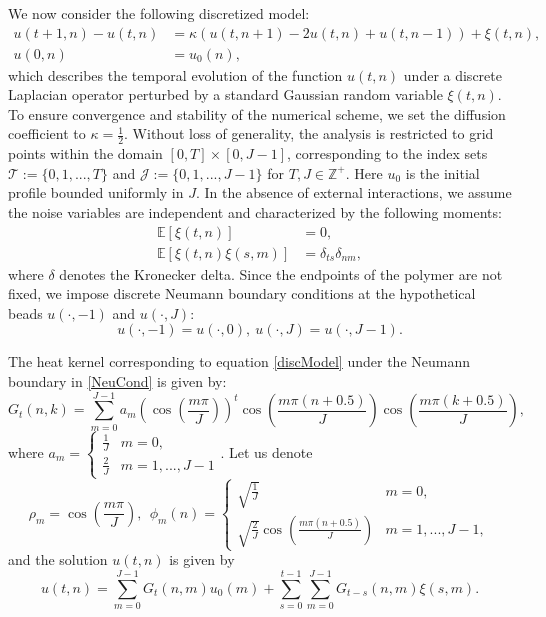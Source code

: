 \documentclass[12pt]{amsart}
\numberwithin{equation}{section}
\newcommand{\Z}{\mathbb{Z}}
\newcommand{\E}{\mathbb{E}}
\newcommand{\1}{\mathbf{1}}
\begin{document}
We now consider the following discretized model:
\begin{equation}
\label{discModel}
\begin{split}
 u(t+1,n)-u(t,n) &= \kappa\left(u(t,n+1)-2u(t,n)+u(t,n-1)\right)+\xi(t,n),\\
 u(0,n) &= u_0(n),
\end{split}
\end{equation}
which describes the temporal evolution of the function $u(t,n)$ under a discrete Laplacian operator perturbed by a standard Gaussian random variable $\xi(t,n)$. To ensure convergence and stability of the numerical scheme, we set the diffusion coefficient to $\kappa = \frac{1}{2}$. Without loss of generality, the analysis is restricted to grid points within the domain $[0,T]\times[0,J-1]$, corresponding to the index sets $\mathcal{T}:=\{0,1,...,T\}$ and $\mathcal{J}:=\{0,1,...,J-1\}$ for $T,J\in\Z^+$. Here $u_0$ is the initial profile bounded uniformly in $J$. In the absence of external interactions, we assume the noise variables are independent and characterized by the following moments:
\begin{equation}
\label{noise}
\begin{split}
\E[\xi(t,n)] &= 0,\\
\E[\xi(t,n)\xi(s,m)]&=\delta_{ts}\delta_{nm},
\end{split}
\end{equation}
where $\delta$ denotes the Kronecker delta. Since the endpoints of the polymer are not fixed, we impose discrete Neumann boundary conditions at the hypothetical beads $u(\cdot,-1)$ and $u(\cdot,J)$:
\begin{equation}
\label{NeuCond}
u(\cdot,-1) = u(\cdot,0),~u(\cdot,J) = u(\cdot, J-1).
\end{equation}

The heat kernel corresponding to equation \eqref{discModel} under the Neumann boundary in \eqref{NeuCond} is given by:
\begin{equation*}
    G_t(n,k)=\sum_{m=0}^{J-1}a_m\left(\cos\left(\frac{m\pi}{J}\right)\right)^{t}\cos\left(\frac{m\pi(n+0.5)}{J}\right)\cos\left(\frac{m\pi(k+0.5)}{J}\right),
\end{equation*}
where $a_m = \begin{cases}
\frac{1}{J}& m=0,\\
\frac{2}{J}&m=1,...,J-1
\end{cases}$.
Let us denote 
\begin{equation}
\label{kernel_notation}
\rho_m =\cos\left(\frac{m\pi}{J}\right),~~\phi_m(n)=\begin{cases}
\sqrt{\frac{1}{J}}& m=0,\\
\sqrt{\frac{2}{J}}\cos\left(\frac{m\pi(n+0.5)}{J}\right)&m=1,...,J-1,
\end{cases}
\end{equation}
and the solution $u(t,n)$ is given by
\begin{equation}
\label{sol}
    u(t,n)=\sum_{m=0}^{J-1}G_t(n,m)u_0(m) + \sum_{s=0}^{t-1}\sum_{m=0}^{J-1}G_{t-s}(n,m)\xi(s,m).
\end{equation}
\end{document}
